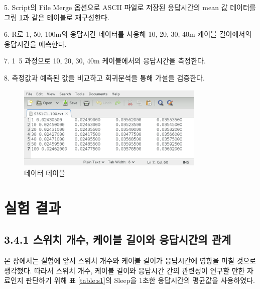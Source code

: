 \documentclass[11pt
  , a4paper
  , article
  , oneside
]{memoir}
\begin{document}
5. Script의 File Merge 옵션으로 ASCII 파일로 저장된 응답시간의 mean 값 데이터를 그림 \ref{fig:time_table}과 같은 테이블로 재구성한다. \par
6. R로 1, 50, 100m의 응답시간 데이터를 사용해 10, 20, 30, 40m 케이블 길이에서의 응답시간을 예측한다.\par
7. 1~5 과정으로 10, 20, 30, 40m 케이블에서의 응답시간을 측정한다.\par
8. 측정값과 예측된 값을 비교하고 회귀분석을 통해 가설을 검증한다.\par

\begin{figure}[!htb]
  \centering
  \includegraphics[width=0.8\textwidth]{./images/timetable.eps}
  \caption{데이터 테이블}
  \label{fig:time_table}   
\end{figure}

\clearpage
\section{실험 결과}
\subsection{3.4.1 스위치 개수, 케이블 길이와 응답시간의 관계}
본 장에서는 실험에 앞서 스위치 개수와 케이블 길이가 응답시간에 영향을 미칠 것으로 생각했다. 따라서 스위치 개수, 케이블 길이와 응답시간 간의 관련성이 연구할 만한 자료인지 판단하기 위해 표 \ref{table:s1}의 Sleep을 1초한 응답시간의 평균값을 사용하였다. 
\end{document}
